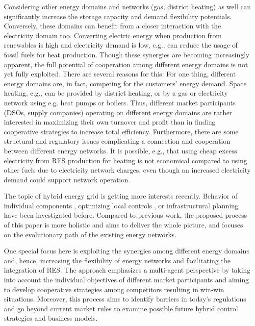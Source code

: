 \documentclass[review]{elsarticle}
\begin{document}
Considering other energy domains and networks (gas, district
heating) as well can significantly increase the storage capacity and
demand flexibility potentials. Conversely, these domains can benefit
from a closer interaction with the electricity domain too. Converting
electric energy when production from renewables is high and
electricity demand is low, e.g., can reduce the usage of
fossil fuels for heat production. Though these synergies are becoming
increasingly apparent, the full potential of cooperation among
different energy domains is not yet fully exploited. There are
several reasons for this: For one thing, different energy domains are,
in fact, competing for the customers’ energy demand. Space heating, e.g.,
can be provided by district heating,  or by a gas or electricity network
using e.g. heat pumps or boilers. Thus, different market
participants (DSOs, supply companies) operating on different energy
domains are rather interested in maximizing their own turnover and
profit than in finding cooperative strategies to increase total
efficiency. Furthermore, there are some structural and regulatory
issues complicating a connection and cooperation between different
energy networks. It is possible, e.g., that using cheap excess
electricity from RES production for heating is not economical compared
to using other fuels due to electricity network charges, even though
an increased electricity demand could support network operation.

The topic of hybrid energy grid is getting more interests recently. 
Behavior of individual components \cite{keirstead_2012}, optimizing
local controls \cite{etransport}\cite{arnold_2009}, or infrastructural
planning \cite{infraplan} have been investigated before. 
Compared to previous work, the proposed process of this paper is more
holistic and aims to deliver the whole picture, and focuses on the
evolutionary path of the existing energy networks. 

One special focus here is exploiting the synergies among different
energy domains and, hence, increasing the flexibility of energy
networks and facilitating the integration of RES. The approach
emphasizes a multi-agent perspective by taking into account the
individual objectives of different market participants and aiming to
develop cooperative strategies among competitors resulting in win-win 
situations. Moreover, this process aims to identify barriers in
today’s regulations and go beyond current market rules to examine
possible future hybrid control strategies and business models. 
\end{document}

